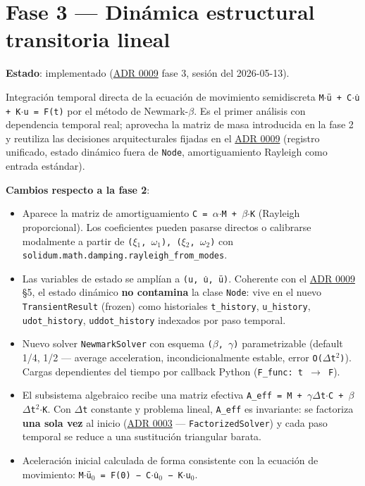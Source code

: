 \documentclass[11pt,oneside]{report}
\begin{document}
\section{Fase 3 --- Dinámica estructural transitoria lineal}

\textbf{Estado}: implementado (\hyperref[adr:0009]{ADR 0009} fase 3, sesión del 2026-05-13).

Integración temporal directa de la ecuación de movimiento semidiscreta \texttt{M\ensuremath{\cdot}ü + C\ensuremath{\cdot}u̇ + K\ensuremath{\cdot}u = F(t)} por el método de Newmark-\ensuremath{\beta}. Es el primer análisis con dependencia temporal real; aprovecha la matriz de masa introducida en la fase 2 y reutiliza las decisiones arquitecturales fijadas en el \hyperref[adr:0009]{ADR 0009} (registro unificado, estado dinámico fuera de \texttt{Node}, amortiguamiento Rayleigh como entrada estándar).

\textbf{Cambios respecto a la fase 2}:

\begin{itemize}
  \item Aparece la matriz de amortiguamiento \texttt{C = \ensuremath{\alpha}\ensuremath{\cdot}M + \ensuremath{\beta}\ensuremath{\cdot}K} (Rayleigh proporcional). Los coeficientes pueden pasarse directos o calibrarse modalmente a partir de \texttt{(\ensuremath{\xi}\ensuremath{_{1}}, \ensuremath{\omega}\ensuremath{_{1}}), (\ensuremath{\xi}\ensuremath{_{2}}, \ensuremath{\omega}\ensuremath{_{2}})} con \texttt{solidum.\allowbreak{}math.\allowbreak{}damping.\allowbreak{}rayleigh\_\allowbreak{}from\_\allowbreak{}modes}.
  \item Las variables de estado se amplían a \texttt{(u, u̇, ü)}. Coherente con el \hyperref[adr:0009]{ADR 0009} §5, el estado dinámico \textbf{no contamina} la clase \texttt{Node}: vive en el nuevo \texttt{TransientResult} (frozen) como historiales \texttt{t\_history}, \texttt{u\_history}, \texttt{udot\_history}, \texttt{uddot\_history} indexados por paso temporal.
  \item Nuevo solver \texttt{NewmarkSolver} con esquema \texttt{(\ensuremath{\beta}, \ensuremath{\gamma})} parametrizable (default 1/4, 1/2 --- average acceleration, incondicionalmente estable, error \texttt{O(\ensuremath{\Delta}t\ensuremath{^{2}})}). Cargas dependientes del tiempo por callback Python (\texttt{F\_func: t \ensuremath{\to} F}).
  \item El subsistema algebraico recibe una matriz efectiva \texttt{A\_\allowbreak{}eff = M + \ensuremath{\gamma}\ensuremath{\Delta}t\ensuremath{\cdot}C + \ensuremath{\beta}\ensuremath{\Delta}t\ensuremath{^{2}}\ensuremath{\cdot}K}. Con \texttt{\ensuremath{\Delta}t} constante y problema lineal, \texttt{A\_eff} es invariante: se factoriza \textbf{una sola vez} al inicio (\hyperref[adr:0003]{ADR 0003} --- \texttt{FactorizedSolver}) y cada paso temporal se reduce a una sustitución triangular barata.
  \item Aceleración inicial calculada de forma consistente con la ecuación de movimiento: \texttt{M\ensuremath{\cdot}ü\ensuremath{_{0}} = F(0) − C\ensuremath{\cdot}u̇\ensuremath{_{0}} − K\ensuremath{\cdot}u\ensuremath{_{0}}}.
\end{itemize}
\end{document}

